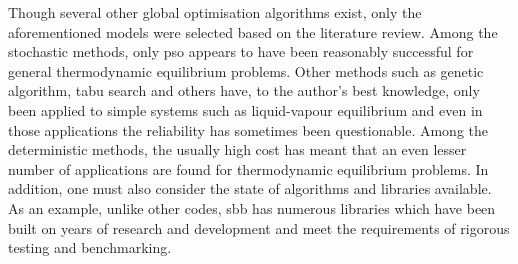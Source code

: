 Though several other global optimisation algorithms exist, only the aforementioned models were selected based on the literature review. Among the stochastic methods, only \gls{pso} appears to have been reasonably successful for general thermodynamic equilibrium problems. Other methods such as genetic algorithm, tabu search and others have, to the author's best knowledge, only been applied to simple systems such as liquid-vapour equilibrium and even in those applications the reliability has sometimes been questionable. Among the deterministic methods, the usually high cost has meant that an even lesser number of applications are found for thermodynamic equilibrium problems. In addition, one must also consider the state of algorithms and libraries available. As an example, unlike other codes, \gls{sbb} has numerous libraries which have been built on years of research and development and meet the requirements of rigorous testing and benchmarking. 


